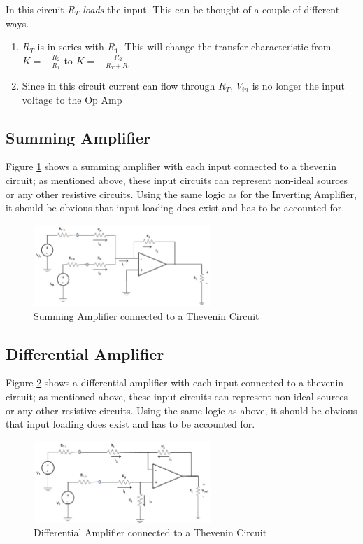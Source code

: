\documentclass{handout}
\begin{document}
In this circuit $R_T$ {\em loads} the input.  This can be thought of a couple of different ways.

\begin{enumerate}
\item $R_T$ is in series with $R_1$.  This will change the transfer characteristic from $K=-\frac{R_2}{R_1}$ to $K=-\frac{R_2}{R_T + R_1}$
\item Since in this circuit current can flow through $R_T$, $V_{in}$ is no longer the input voltage to the Op Amp
\end{enumerate}

\newpage
\clearpage
\pagebreak

\subsection{Summing Amplifier}
Figure \ref{fig: SummingAmplifier} shows a summing amplifier with each input connected to a thevenin circuit; as mentioned above, these input circuits can represent  non-ideal sources or any other resistive circuits.  Using the same logic as for the Inverting Amplifier, it should be obvious that input loading does exist and has to be accounted for.

\begin{figure} [h!]
\centering
\includegraphics[width=0.6\textwidth]{SummingAmplifier.jpg}
\caption{Summing Amplifier connected to a Thevenin Circuit}
\label{fig: SummingAmplifier}
\end{figure}

\subsection{Differential Amplifier}
Figure \ref{fig: DifferentialAmplifier} shows a differential amplifier with each input connected to a thevenin circuit; as mentioned above, these input circuits can represent  non-ideal sources or any other resistive circuits.  Using the same logic as above, it should be obvious that input loading does exist and has to be accounted for.

\begin{figure} [h!]
\centering
\includegraphics[width=0.6\textwidth]{DifferentialAmplifier.jpg}
\caption{Differential Amplifier connected to a Thevenin Circuit}
\label{fig: DifferentialAmplifier}
\end{figure}
\end{document}
